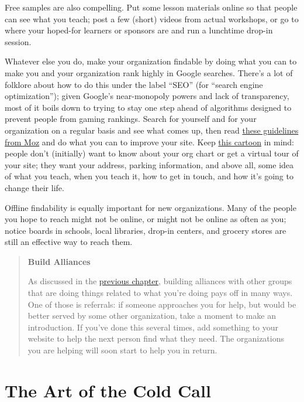\documentclass[10pt,statementpaper]{memoir}
\begin{document}
Free samples are also compelling. Put some lesson materials online so
that people can see what you teach; post a few (short) videos from
actual workshops, or go to where your hoped-for learners or sponsors are
and run a lunchtime drop-in session.

Whatever else you do, make your organization findable by doing what you
can to make you and your organization rank highly in Google searches.
There's a lot of folklore about how to do this under the label ``SEO''
(for ``search engine optimization''); given Google's near-monopoly
powers and lack of transparency, most of it boils down to trying to stay
one step ahead of algorithms designed to prevent people from gaming
rankings. Search for yourself and for your organization on a regular
basis and see what comes up, then read
\href{https://moz.com/learn/seo/on-page-factors}{these guidelines from
Moz} and do what you can to improve your site. Keep
\href{https://xkcd.com/773/}{this cartoon} in mind: people don't
(initially) want to know about your org chart or get a virtual tour of
your site; they want your address, parking information, and above all,
some idea of what you teach, when you teach it, how to get in touch, and
how it's going to change their life.

Offline findability is equally important for new organizations. Many of
the people you hope to reach might not be online, or might not be online
as often as you; notice boards in schools, local libraries, drop-in
centers, and grocery stores are still an effective way to reach them.

\begin{quote}
\textbf{Build Alliances}

As discussed in the \href{community.html}{previous chapter}, building
alliances with other groups that are doing things related to what you're
doing pays off in many ways. One of those is referrals: if someone
approaches you for help, but would be better served by some other
organization, take a moment to make an introduction. If you've done this
several times, add something to your website to help the next person
find what they need. The organizations you are helping will soon start
to help you in return.
\end{quote}

\section{The Art of the Cold Call}\label{the-art-of-the-cold-call}
\end{document}
